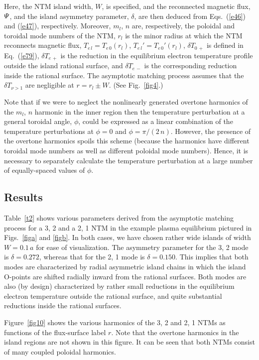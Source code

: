 \documentclass{iopjournal}
\begin{document}
Here, the NTM island width, $W$, is specified, and the reconnected magnetic flux, ${\mit\Psi}$, and the island asymmetry parameter, $\delta$,  are then deduced from Eqs.~(\ref{e46}) and (\ref{e47}), respectively. Moreover,
$m_l$, $n$ are, respectively, the poloidal and toroidal mode numbers of the NTM, $r_l$ is the minor radius at which the NTM reconnects magnetic
flux, $T_{e\,l}=T_{e\,0}(r_l)$, $T_{e\,l}' = T_{e\,0}'(r_l)$, $\delta T_{0\,+}$ is defined in Eq.~(\ref{e79}), $\delta T_{e\,+}$ is the reduction in the equilibrium electron temperature profile outside the
island rational surface, and $\delta T_{e\,-}$ is the corresponding reduction inside the rational surface. The asymptotic matching process assumes that
the $\delta T_{\nu>1}$ are negligible at $r= r_l\pm W$. (See Fig.~\ref{fig4}.)

 Note that if we were to neglect the nonlinearly generated overtone harmonics of the $m_l$, $n$ harmonic in the inner
region then the temperature perturbation at a general toroidal angle, $\phi$, could be expressed as  a linear combination of the temperature perturbations at $\phi=0$ and
$\phi=\pi/(2\,n)$. However, the presence of the overtone harmonics spoils this scheme (because the harmonics have different toroidal mode numbers as
well as different poloidal mode numbers). Hence, it is necessary to separately calculate the temperature perturbation at a large number of equally-spaced values of $\phi$. 

\subsection{Results}
Table~\ref{t2} shows various parameters derived from the asymptotic matching process for a 3, 2 and a 2, 1 NTM in the example plasma equilibrium pictured in Figs.~\ref{figa} and
\ref{figb}. In both cases, we have chosen rather wide islands of width $W=0.1\,a$ for ease of visualization. The asymmetry parameter for the 3, 2 mode is $\delta=0.272$,
whereas that for the 2, 1 mode is $\delta=0.150$. This implies that both modes are characterized by radial asymmetric island chains in which the island O-points are
shifted radially inward from the rational surfaces. Both modes are also (by design) characterized by rather small reductions in the equilibrium electron temperature outside the
rational surface, and quite substantial reductions inside the rational surfaces.

 Figure~\ref{fig10} shows the various harmonics of the 3, 2 and 2, 1 NTMs as functions of the flux-surface
label $r$. Note that
the overtone harmonics in the island regions are not shown in this figure. It can be seen that both NTMs consist of many coupled poloidal harmonics. 
\end{document}
